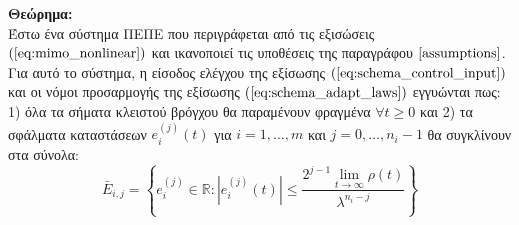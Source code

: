 \textbf{Θεώρημα:}\\
Έστω ένα σύστημα ΠΕΠΕ που περιγράφεται από τις εξισώσεις $(\ref{eq:mimo_nonlinear})$ και ικανοποιεί τις υποθέσεις της παραγράφου $\ref{assumptions}$. Για αυτό το σύστημα, η είσοδος ελέγχου της εξίσωσης $(\ref{eq:schema_control_input})$ και οι νόμοι προσαρμογής της εξίσωσης $(\ref{eq:schema_adapt_laws})$ εγγυώνται πως: 1) όλα τα σήματα κλειστού βρόγχου θα παραμένουν φραγμένα $\forall t\geq 0$ και 2) τα σφάλματα καταστάσεων $e_i^{(j)}(t)$ για $i=1,\dots,m$ και $j = 0,\dots,n_i-1$ θα συγκλίνουν στα σύνολα:
\begin{equation}
\bar{E}_{i,j} = \left\{ e_i^{(j)} \in \mathbb{R} :
| e_i^{(j)}(t) | \leq
\frac{ 2^{j-1} \lim\limits_{t \rightarrow \infty}\rho(t)}{\lambda^{n_i - j}} \right\}
\label{eq:final_state_error_sets}
\end{equation}

